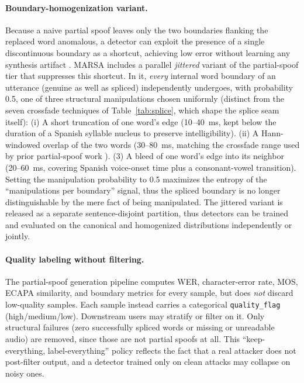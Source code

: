 \documentclass[11pt]{article}
\begin{document}
\paragraph{Boundary-homogenization variant.} Because a naive partial
spoof leaves only the two boundaries flanking the replaced word
anomalous, a detector can exploit the presence of a single discontinuous
boundary as a shortcut, achieving low error without learning any
synthesis artifact \citep{negroni2024splicing}. MARSA includes a
parallel \emph{jittered} variant of the partial-spoof tier that
suppresses this shortcut. In it, \emph{every} internal word boundary of
an utterance (genuine as well as spliced) independently undergoes, with
probability 0.5, one of three structural manipulations chosen uniformly
(distinct from the seven crossfade techniques of Table~\ref{tab:splice},
which shape the splice seam itself):
(i) A short truncation of one word's edge (10--\SI{40}{\milli\second}, kept
below the duration of a Spanish syllable nucleus to preserve
intelligibility). (ii) A Hann-windowed overlap of the two words
(30--\SI{80}{\milli\second}, matching the crossfade range used by prior
partial-spoof work \citep{luong2024llama}). (3) A bleed of one word's
edge into its neighbor (20--\SI{60}{\milli\second}, covering Spanish
voice-onset time plus a consonant-vowel transition). Setting the
manipulation probability to 0.5 maximizes the entropy of the
``manipulations per boundary'' signal, thus the spliced boundary is
no longer distinguishable by the mere fact of being manipulated. The jittered variant is released as a separate
sentence-disjoint partition, thus detectors can be trained and
evaluated on the canonical and homogenized distributions independently or
jointly.

\paragraph{Quality labeling without filtering.} The partial-spoof
generation pipeline computes WER, character-error rate, MOS, ECAPA similarity, and
boundary metrics for every sample, but does \emph{not} discard
low-quality samples. Each sample instead carries a categorical
\texttt{quality\_flag} (high/medium/low). Downstream users may stratify
or filter on it. Only structural failures (zero successfully spliced
words or missing or unreadable audio) are removed, since those are
not partial spoofs at all. This ``keep-everything, label-everything''
policy
reflects the fact that a real attacker does not post-filter output, and a
detector trained only on clean attacks may collapse on noisy ones.
\end{document}

